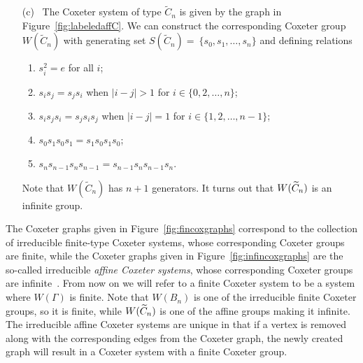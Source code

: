 \begin{example}
\begin{itemize}
\item[(c)~] The Coxeter system of type $\widetilde C_n$ is given by the graph in Figure~\ref{fig:labeledaffC}. We can construct the corresponding Coxeter group $W(\widetilde C_n)$ with generating set $S(\widetilde{C}_n)=~\{s_0, s_1, \ldots ,s_n\}$ and defining relations 
\begin{enumerate}[leftmargin=2cm]
	\item $s_i^2=e$ for all $i$;
	\item $s_is_j=s_js_i$ when $|i-j|>1$ for $i \in \{0,2, \ldots, n\}$;
	\item $s_is_js_i=s_js_is_j$ 	when $|i-j|=1$ for $i \in \{1,2, \ldots, n-1\}$;
	\item $s_0s_1s_0s_1=s_1s_0s_1s_0$;
	\item $s_ns_{n-1}s_ns_{n-1}=s_{n-1}s_ns_{n-1}s_n.$
\end{enumerate}
Note that $W(\widetilde{C}_n)$ has $n+1$ generators. It turns out that $W(\widetilde{C}_n)$ is an infinite group.
\end{itemize}
\end{example}



The Coxeter graphs given in Figure~\ref{fig:fincoxgraphs} correspond to the collection of irreducible finite-type Coxeter systems, whose corresponding Coxeter groups are finite, while the Coxeter graphs given in Figure~\ref{fig:infincoxgraphs} are the so-called irreducible \emph{affine Coxeter systems}, whose corresponding Coxeter groups are infinite~\cite{Humphreys1990}. From now on we will refer to a finite Coxeter system to be a system where $W(\Gamma)$ is finite. Note that $W(B_n)$ is one of the irreducible finite Coxeter groups, so it is finite, while $W(\widetilde{C}_n)$ is one of the affine groups making it infinite. The irreducible affine Coxeter systems are unique in that if a vertex is removed along with the corresponding edges from the Coxeter graph, the newly created graph will result in a Coxeter system with a finite Coxeter group. 

